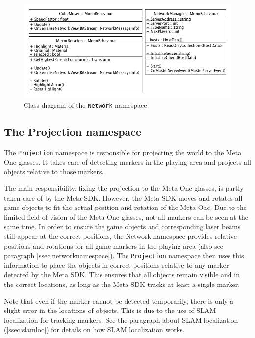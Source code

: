 			\begin{figure}[ht]
				\includegraphics[width=\textwidth]{ClassDiagramNetwork}
				\caption{Class diagram of the \texttt{Network} namespace}
				\label{fig:classdiagramnetwork}
			\end{figure}
			
		\subsection{The Projection namespace} \label{ssec:projectionnamespace}
			The \texttt{Projection} namespace is responsible for projecting the 
			world to the Meta One glasses. It takes care of detecting 
			markers in the playing area and projects all objects relative
			to those markers. 
			
			The main responsibility, fixing the projection to the Meta One 
			glasses, is partly taken care of by the Meta SDK. However, the 
			Meta SDK moves and rotates all game objects to fit the actual 
			position and rotation of the Meta One. Due to the limited field 
			of vision of the Meta One glasses, not all markers can be seen at 
			the same time. In order to ensure the game objects and 
			corresponding laser beams still appear at the correct positions,
			the Network namespace provides relative positions and rotations for 
			all game markers in the playing area (also see paragraph 
			\ref{ssec:networknamespace}). The \texttt{Projection} namespace then uses
			this information to place the objects in correct positions relative
			to any marker detected by the Meta SDK. This ensures that all objects
			remain visible and in the correct locations, as long as the Meta SDK 
			tracks at least a single marker.
			
			Note that even if the marker cannot be detected temporarily, there 
			is only a slight error in the locations of objects. This is due to 
			the use of SLAM localization for tracking markers. See the paragraph
			about SLAM localization (\ref{ssec:slamloc}) for details on how SLAM 
			localization works.
			
